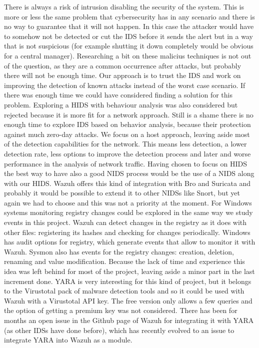 \linej
\linej
There is always a risk of intrusion disabling the security of the system.
This is more or less the same problem that cybersecurity has in any scenario and there is no way to guarantee that it will not happen.
In this case the attacker would have to somehow not be detected or cut the IDS before it sends the alert but in a way that is not suspicious (for example shutting it down completely would be obvious for a central manager).
Researching a bit on these malicius techniques is not out of the question, as they are a common occurrence after attacks, but probably there will not be enough time.
\linej
Our approach is to trust the IDS and work on improving the detection of known attacks instead of the worst case scenario.
If there was enough time we could have considered finding a solution for this problem.
\linej
\linej
Exploring a HIDS with behaviour analysis was also considered but rejected because it is more fit for a network approach. Still is a shame there is no enough time to explore IDS based on behavior analysis, because their protection against much zero-day attacks.
\linej
\linej
We focus on a host approach, leaving aside most of the detection capabilities for the network. This means less detection, a lower detection rate, less options to improve the detection process and later and worse performance in the analysis of network traffic. Having chosen to focus on HIDS the best way to have also a good NIDS process would be the use of a NIDS along with our HIDS.
\linej
Wazuh offers this kind of integration with Bro and Suricata and probably it would be possible to extend it to other NIDSs like Snort, but yet again we had to choose and this was not a priority at the moment.
\linej
\linej
For Windows systems monitoring registry changes could be explored in the same way we study events in this project.
Wazuh can detect changes in the registry as it does with other files: registering its hashes and checking for changes periodically.
Windows has audit options for registry, which generate events that allow to monitor it with Wazuh.
Sysmon also has events for the registry changes: creation, deletion, renaming and value modification.
Because the lack of time and experience this idea was left behind for most of the project, leaving aside a minor part in the last increment done.
\linej
\linej
YARA is very interesting for this kind of project, but it belongs to the Virustotal pack of malware detection tools and so it could be used with Wazuh with a Virustotal API key. The free version only allows a few queries and the option of getting a premium key was not considered. There has been for months an open issue in the Github page of Wazuh for integrating it with YARA (as other IDSs have done before), which has recently evolved to an issue to integrate YARA into Wazuh as a module\cite{yara_module}.
